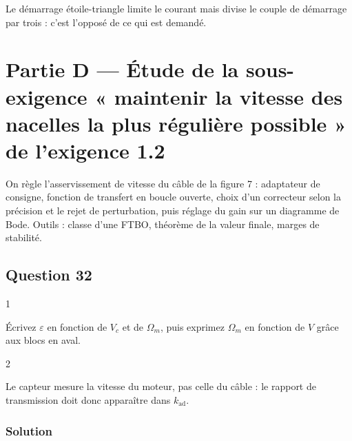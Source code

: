 \documentclass[11pt,a4paper]{article}
\begin{document}
\begin{piege}

Le démarrage étoile-triangle limite le courant mais divise le couple de démarrage par trois : c'est l'opposé de ce qui est demandé.

\end{piege}

\hypertarget{partie-d-uxe9tude-de-la-sous-exigence-maintenir-la-vitesse-des-nacelles-la-plus-ruxe9guliuxe8re-possible-de-lexigence-1.2}{%
\section{Partie D --- Étude de la sous-exigence « maintenir la vitesse des nacelles la plus régulière possible » de l'exigence 1.2}\label{partie-d-uxe9tude-de-la-sous-exigence-maintenir-la-vitesse-des-nacelles-la-plus-ruxe9guliuxe8re-possible-de-lexigence-1.2}}

On règle l'asservissement de vitesse du câble de la figure 7 : adaptateur de consigne, fonction de transfert en boucle ouverte, choix d'un correcteur selon la précision et le rejet de perturbation, puis réglage du gain sur un diagramme de Bode. Outils : classe d'une FTBO, théorème de la valeur finale, marges de stabilité.

\hypertarget{question-32}{%
\subsection{Question 32}\label{question-32}}

\begin{indication}{1}

Écrivez \(\varepsilon\) en fonction de \(V_c\) et de \(\Omega_m\), puis exprimez \(\Omega_m\) en fonction de \(V\) grâce aux blocs en aval.

\end{indication}

\begin{indication}{2}

Le capteur mesure la vitesse du moteur, pas celle du câble : le rapport de transmission doit donc apparaître dans \(k_{\text{ad}}\).

\end{indication}

\hypertarget{solution-31}{%
\subsubsection{Solution}\label{solution-31}}
\end{document}
